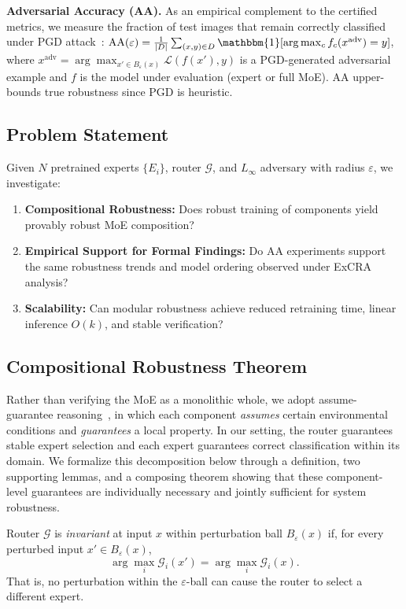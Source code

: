 \documentclass[runningheads]{llncs}
\begin{document}
\textbf{Adversarial Accuracy (AA).} As an empirical complement to the certified metrics, we measure the fraction of test images that remain correctly classified under PGD attack~\cite{madry2018}: $\text{AA}(\varepsilon) = \frac{1}{|D|} \sum_{(x,y) \in D} \mathbbm{1}[\arg\max_c f_c(x^{\text{adv}}) = y]$, where $x^{\text{adv}} = \arg\max_{x' \in B_\varepsilon(x)} \mathcal{L}(f(x'), y)$ is a PGD-generated adversarial example and $f$ is the model under evaluation (expert or full MoE). AA upper-bounds true robustness since PGD is heuristic.

\subsection{Problem Statement}

Given $N$ pretrained experts $\{E_i\}$, router $\mathcal{G}$, and $L_\infty$ adversary with radius $\varepsilon$, we investigate:
\begin{enumerate}
    \item \textbf{Compositional Robustness:} Does robust training of components yield provably robust MoE composition?
    \item \textbf{Empirical Support for Formal Findings:} Do AA experiments support the same robustness trends and model ordering observed under ExCRA analysis?
    \item \textbf{Scalability:} Can modular robustness achieve reduced retraining time, linear inference $O(k)$, and stable verification?
\end{enumerate}

\subsection{Compositional Robustness Theorem}
\label{sec:compositional}

Rather than verifying the MoE as a monolithic whole, we adopt assume-guarantee reasoning~\cite{henzinger1998}, in which each component \emph{assumes} certain environmental conditions and \emph{guarantees} a local property. In our setting, the router guarantees stable expert selection and each expert guarantees correct classification within its domain. We formalize this decomposition below through a definition, two supporting lemmas, and a composing theorem showing that these component-level guarantees are individually necessary and jointly sufficient for system robustness.

\begin{definition}
\label{def:router_invariance}
Router $\mathcal{G}$ is \emph{invariant} at input $x$ within perturbation ball $B_\varepsilon(x)$ if, for every perturbed input $x' \in B_\varepsilon(x)$,
\[
    \arg\max_i \mathcal{G}_i(x') = \arg\max_i \mathcal{G}_i(x).
\]
That is, no perturbation within the $\varepsilon$-ball can cause the router to select a different expert.
\end{definition}
\end{document}
